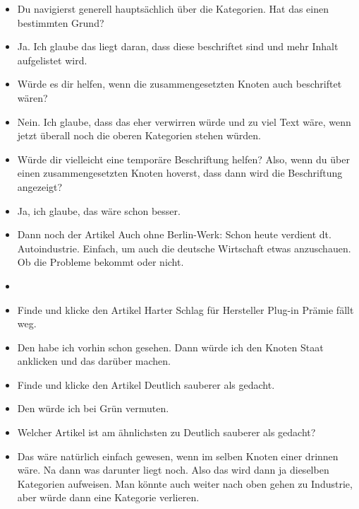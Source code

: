 {\begin{itemize}[]
            \item {} Du navigierst generell hauptsächlich über die Kategorien.
                  Hat das einen bestimmten Grund?
            \item {} Ja.
                  Ich glaube das liegt daran, dass diese beschriftet sind und mehr Inhalt aufgelistet wird.
            \item {} Würde es dir helfen, wenn die zusammengesetzten Knoten auch beschriftet wären?
            \item {} Nein.
                  Ich glaube, dass das eher verwirren würde und zu viel Text wäre, wenn jetzt überall noch die oberen Kategorien stehen würden.
            \item {} Würde dir vielleicht eine temporäre Beschriftung helfen?
                  Also, wenn du über einen zusammengesetzten Knoten hoverst, dass dann wird die Beschriftung angezeigt?
            \item {} Ja, ich glaube, das wäre schon besser.
            \item {} Dann noch der Artikel \flqq Auch ohne Berlin-Werk: Schon heute verdient dt. Autoindustrie\frqq{}.
                  Einfach, um auch die deutsche Wirtschaft etwas anzuschauen.
                  Ob die Probleme bekommt oder nicht.
            \item {}
            \item {} Finde und klicke den Artikel \flqq Harter Schlag für Hersteller Plug-in Prämie fällt weg\frqq{}.
            \item {} Den habe ich vorhin schon gesehen.
                  Dann würde ich den Knoten Staat anklicken und das darüber machen.
            \item {} Finde und klicke den Artikel \flqq Deutlich sauberer als gedacht\frqq{}.
            \item {} Den würde ich bei Grün vermuten.
            \item {} Welcher Artikel ist am ähnlichsten zu \flqq Deutlich sauberer als gedacht\frqq{}?
            \item {} Das wäre natürlich einfach gewesen, wenn im selben Knoten einer drinnen wäre.
                  Na dann was darunter liegt noch. Also das wird dann ja dieselben Kategorien aufweisen.
                  Man könnte auch weiter nach oben gehen zu Industrie, aber würde dann eine Kategorie verlieren.

\end{itemize}}
